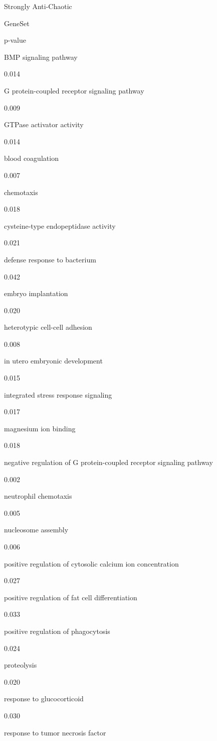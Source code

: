 \documentclass[
  letterpaper,
  DIV=11,
  numbers=noendperiod,
  openany,
  oneside]{scrreprt}
\begin{document}
Strongly Anti-Chaotic

GeneSet

p-value

BMP signaling pathway

0.014

G protein-coupled receptor signaling pathway

0.009

GTPase activator activity

0.014

blood coagulation

0.007

chemotaxis

0.018

cysteine-type endopeptidase activity

0.021

defense response to bacterium

0.042

embryo implantation

0.020

heterotypic cell-cell adhesion

0.008

in utero embryonic development

0.015

integrated stress response signaling

0.017

magnesium ion binding

0.018

negative regulation of G protein-coupled receptor signaling pathway

0.002

neutrophil chemotaxis

0.005

nucleosome assembly

0.006

positive regulation of cytosolic calcium ion concentration

0.027

positive regulation of fat cell differentiation

0.033

positive regulation of phagocytosis

0.024

proteolysis

0.020

response to glucocorticoid

0.030

response to tumor necrosis factor
\end{document}
